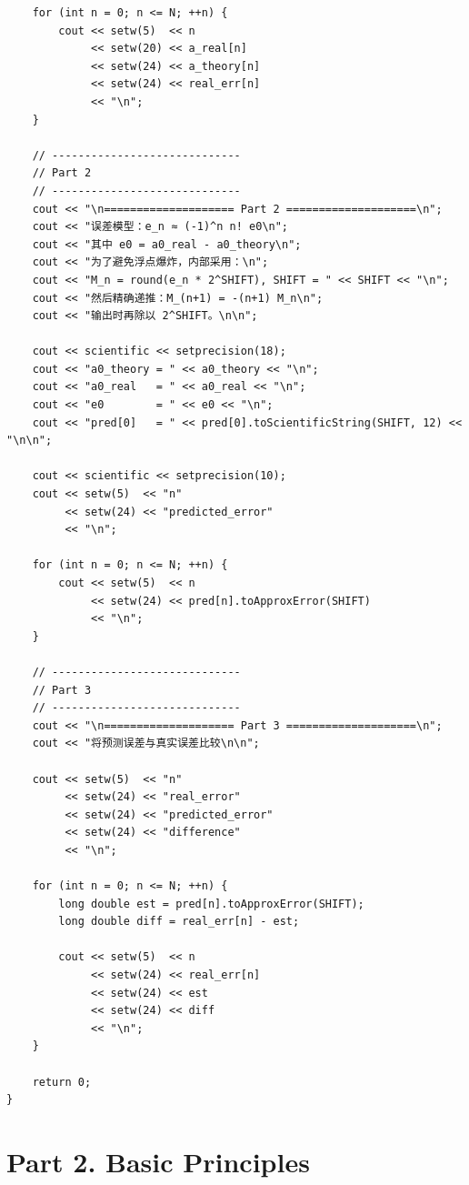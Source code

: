 \documentclass[12pt,a4paper]{article}
\begin{document}
\begin{lstlisting}
    for (int n = 0; n <= N; ++n) {
        cout << setw(5)  << n
             << setw(20) << a_real[n]
             << setw(24) << a_theory[n]
             << setw(24) << real_err[n]
             << "\n";
    }

    // -----------------------------
    // Part 2
    // -----------------------------
    cout << "\n==================== Part 2 ====================\n";
    cout << "误差模型：e_n ≈ (-1)^n n! e0\n";
    cout << "其中 e0 = a0_real - a0_theory\n";
    cout << "为了避免浮点爆炸，内部采用：\n";
    cout << "M_n = round(e_n * 2^SHIFT), SHIFT = " << SHIFT << "\n";
    cout << "然后精确递推：M_(n+1) = -(n+1) M_n\n";
    cout << "输出时再除以 2^SHIFT。\n\n";

    cout << scientific << setprecision(18);
    cout << "a0_theory = " << a0_theory << "\n";
    cout << "a0_real   = " << a0_real << "\n";
    cout << "e0        = " << e0 << "\n";
    cout << "pred[0]   = " << pred[0].toScientificString(SHIFT, 12) << "\n\n";

    cout << scientific << setprecision(10);
    cout << setw(5)  << "n"
         << setw(24) << "predicted_error"
         << "\n";

    for (int n = 0; n <= N; ++n) {
        cout << setw(5)  << n
             << setw(24) << pred[n].toApproxError(SHIFT)
             << "\n";
    }

    // -----------------------------
    // Part 3
    // -----------------------------
    cout << "\n==================== Part 3 ====================\n";
    cout << "将预测误差与真实误差比较\n\n";

    cout << setw(5)  << "n"
         << setw(24) << "real_error"
         << setw(24) << "predicted_error"
         << setw(24) << "difference"
         << "\n";

    for (int n = 0; n <= N; ++n) {
        long double est = pred[n].toApproxError(SHIFT);
        long double diff = real_err[n] - est;

        cout << setw(5)  << n
             << setw(24) << real_err[n]
             << setw(24) << est
             << setw(24) << diff
             << "\n";
    }

    return 0;
}
\end{lstlisting}

\section{Part 2. Basic Principles}
\end{document}
